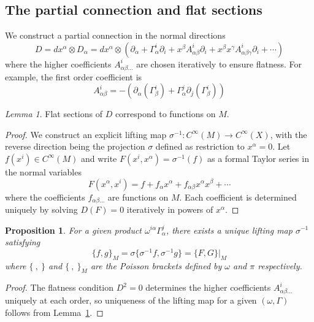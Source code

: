 \documentclass[
  12pt,
  a4paper, oneside
]{report}
\theoremstyle{bolddef}
\newtheorem{proposition}[theorem]{Proposition}
\theoremstyle{remark}
\newtheorem{lemma}[theorem]{Lemma}
\numberwithin{equation}{chapter}
\begin{document}
\subsection*{The partial connection and flat sections}

We construct a partial connection in the normal directions
\begin{equation}\label{eq:partial-conn}
D = dx^\alpha \otimes D_\alpha = dx^\alpha \otimes \left( \partial_\alpha + \Gamma^i_\alpha \partial_i + x^\beta A^i_{\alpha\beta} \partial_i + x^\beta x^\gamma A^i_{\alpha\beta\gamma} \partial_i + \cdots \right)
\end{equation}
where the higher coefficients $A^i_{\alpha\beta\ldots}$ are chosen iteratively to ensure flatness. For example, the first order coefficient is
\[
A^i_{\alpha\beta} = -\left( \partial_\alpha(\Gamma^i_\beta) + \Gamma^j_\alpha \partial_j(\Gamma^i_\beta) \right)
\]

\begin{lemma}\label{lem:flat-sections}
Flat sections of $D$ correspond to functions on $M$.
\end{lemma}
\begin{proof}
We construct an explicit lifting map $\sigma^{-1} : C^\infty(M) \to C^\infty(X)$, with the reverse direction being the projection $\sigma$ defined as restriction to $x^\alpha = 0$. Let $f(x^i) \in C^\infty(M)$ and write $F(x^i, x^\alpha) = \sigma^{-1}(f)$ as a formal Taylor series in the normal variables
\[
F(x^\alpha, x^i) = f + f_\alpha x^\alpha + f_{\alpha\beta} x^\alpha x^\beta + \cdots
\]
where the coefficients $f_{\alpha\beta\ldots}$ are functions on $M$. Each coefficient is determined uniquely by solving $D(F) = 0$ iteratively in powers of $x^\alpha$.
\end{proof}

\begin{proposition}\label{prop:lift-existence}
For a given product $\omega^{i\alpha}\Gamma^j_\alpha$, there exists a unique lifting map $\sigma^{-1}$ satisfying
\begin{equation}\label{eq:poisson-compat}
\{f, g\}_M = \sigma\{\sigma^{-1}f, \sigma^{-1}g\} = \{F, G\}\big|_M
\end{equation}
where $\{\ ,\ \}$ and $\{\ ,\ \}_M$ are the Poisson brackets defined by $\omega$ and $\pi$ respectively.
\end{proposition}
\begin{proof}
The flatness condition $D^2 = 0$ determines the higher coefficients $A^i_{\alpha\beta\ldots}$ uniquely at each order, so uniqueness of the lifting map for a given $(\omega, \Gamma)$ follows from Lemma~\ref{lem:flat-sections}.
\end{proof}
\end{document}
